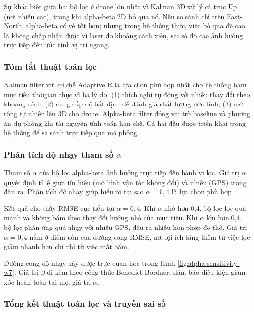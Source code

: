 Sự khác biệt giữa hai bộ lọc ở drone lớn nhất vì Kalman 3D xử lý cả trục Up (nơi nhiễu cao), trong khi alpha-beta 2D bỏ qua nó. Nếu so sánh chỉ trên East-North, alpha-beta có vẻ tốt hơn; nhưng trong hệ thống thực, việc bỏ qua độ cao là không chấp nhận được vì laser đo khoảng cách xiên, sai số độ cao ảnh hưởng trực tiếp đến ước tính vị trí ngang.

\subsubsection{Tóm tắt thuật toán lọc}

\hspace{0.5cm} Kalman filter với cơ chế Adaptive R là lựa chọn phù hợp nhất cho hệ thống bám mục tiêu thờigian thực vì ba lý do: (1) thích nghi tự động với nhiễu thay đổi theo khoảng cách; (2) cung cấp độ bất định để đánh giá chất lượng ước tính; (3) mở rộng tự nhiên lên 3D cho drone. Alpha-beta filter đóng vai trò baseline và phương án dự phòng khi tài nguyên tính toán hạn chế. Cả hai đều được triển khai trong hệ thống để so sánh trực tiếp qua mô phỏng.

\subsubsection{Phân tích độ nhạy tham số \texorpdfstring{$\alpha$}{alpha}}

\hspace{0.5cm} Tham số $\alpha$ của bộ lọc alpha-beta ảnh hưởng trực tiếp đến hành vi lọc. Giá trị $\alpha$ quyết định tỉ lệ giữa tín hiệu (mô hình vận tốc không đổi) và nhiễu (GPS) trong đầu ra. Phân tích độ nhạy giúp hiểu rõ tại sao $\alpha = 0{,}4$ là lựa chọn phù hợp.

Kết quả cho thấy RMSE cực tiểu tại $\alpha = 0{,}4$. Khi $\alpha$ nhỏ hơn 0,4, bộ lọc lọc quá mạnh và không bám theo thay đổi hướng nhỏ của mục tiêu. Khi $\alpha$ lớn hơn 0,4, bộ lọc phản ứng quá nhạy với nhiễu GPS, đầu ra nhiễu hơn phép đo thô. Giá trị $\alpha = 0{,}4$ nằm ở điểm uốn của đường cong RMSE, nơi lợi ích tăng thêm từ việc lọc giảm nhanh hơn chi phí từ việc mất bám.

Đường cong độ nhạy này được trực quan hóa trong Hình \ref{fig:alpha-sensitivity-w7}. Giá trị $\beta$ đi kèm theo công thức Benedict-Bordner, đảm bảo điều kiện giảm xóc hoàn toàn tại mọi giá trị $\alpha$.

\subsubsection{Tổng kết thuật toán lọc và truyền sai số}

